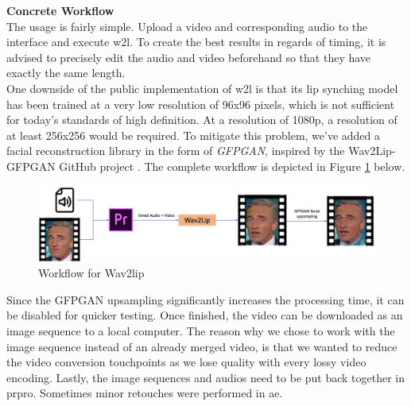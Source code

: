 \documentclass[
  a4paper,  %
  twoside,  %
  bibliography=totoc,
  headsepline,
  cleardoublepage=empty,
  parskip=half,
  draft=false
]{scrbook}
\begin{document}
\textbf{Concrete Workflow} \\
The usage is fairly simple. Upload a video and corresponding audio to the interface and execute \gls{w2l}. To create the best results in regards of timing, it is advised to precisely edit the audio and video beforehand so that they have exactly the same length. \\
One downside of the public implementation of \gls{w2l} is that its lip synching model has been trained at a very low resolution of 96x96 pixels, which is not sufficient for today's standards of high definition. At a resolution of 1080p, a resolution of at least 256x256 would be required. To mitigate this problem, we've added a facial reconstruction library in the form of \textit{GFPGAN}, inspired by the Wav2Lip-GFPGAN GitHub project \cite{sainyAjaysainyWav2LipGFPGAN2023}.
The complete workflow is depicted in Figure \ref{fig:w2l workflow} below.

\begin{figure}[h]
  \centering
  \includegraphics[width=1\textwidth]{./graphics/wav2lip/w2l workflow.png}
  \caption{Workflow for Wav2lip}
  \label{fig:w2l workflow}
\end{figure}

Since the GFPGAN upsampling significantly increases the processing time, it can be disabled for quicker testing. Once finished, the video can be downloaded as an image sequence to a local computer. The reason why we chose to work with the image sequence instead of an already merged video, is that we wanted to reduce the video conversion touchpoints as we lose quality with every lossy video encoding. Lastly, the image sequences and audios need to be put back together in \gls{prpro}. Sometimes minor retouches were performed in \gls{ae}.
\end{document}

